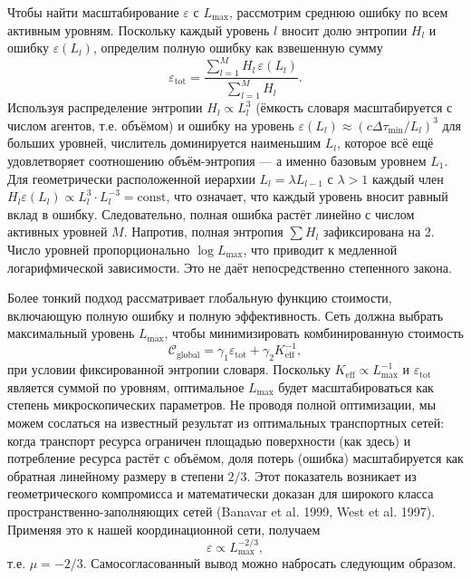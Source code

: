 \documentclass[11pt,a4paper]{article}
\begin{document}
	Чтобы найти масштабирование \(\varepsilon\) с \(L_{\max}\), рассмотрим среднюю ошибку по всем активным уровням. Поскольку каждый уровень \(l\) вносит долю энтропии \(H_l\) и ошибку \(\varepsilon(L_l)\), определим полную ошибку как взвешенную сумму
	\[
	\varepsilon_{\mathrm{tot}} = \frac{\sum_{l=1}^{M} H_l\, \varepsilon(L_l)}{\sum_{l=1}^{M} H_l}.
	\]
	Используя распределение энтропии \(H_l \propto L_l^3\) (ёмкость словаря масштабируется с числом агентов, т.е. объёмом) и ошибку на уровень \(\varepsilon(L_l) \approx (c\Delta\tau_{\min}/L_l)^3\) для больших уровней, числитель доминируется наименьшим \(L_l\), которое всё ещё удовлетворяет соотношению объём-энтропия — а именно базовым уровнем \(L_1\). Для геометрически расположенной иерархии \(L_l = \lambda L_{l-1}\) с \(\lambda > 1\) каждый член \(H_l\varepsilon(L_l) \propto L_l^3 \cdot L_l^{-3} = \text{const}\), что означает, что каждый уровень вносит равный вклад в ошибку. Следовательно, полная ошибка растёт линейно с числом активных уровней \(M\). Напротив, полная энтропия \(\sum H_l\) зафиксирована на 2. Число уровней пропорционально \(\log L_{\max}\), что приводит к медленной логарифмической зависимости. Это не даёт непосредственно степенного закона.
	
	Более тонкий подход рассматривает глобальную функцию стоимости, включающую полную ошибку и полную эффективность. Сеть должна выбрать максимальный уровень \(L_{\max}\), чтобы минимизировать комбинированную стоимость
	\[
	\mathcal{C}_{\mathrm{global}} = \gamma_1 \varepsilon_{\mathrm{tot}} + \gamma_2 K_{\mathrm{eff}}^{-1},
	\]
	при условии фиксированной энтропии словаря. Поскольку \(K_{\mathrm{eff}} \propto L_{\max}^{-1}\) и \(\varepsilon_{\mathrm{tot}}\) является суммой по уровням, оптимальное \(L_{\max}\) будет масштабироваться как степень микроскопических параметров. Не проводя полной оптимизации, мы можем сослаться на известный результат из оптимальных транспортных сетей: когда транспорт ресурса ограничен площадью поверхности (как здесь) и потребление ресурса растёт с объёмом, доля потерь (ошибка) масштабируется как обратная линейному размеру в степени \(2/3\). Этот показатель возникает из геометрического компромисса и математически доказан для широкого класса пространственно-заполняющих сетей (Banavar et al. 1999, West et al. 1997). Применяя это к нашей координационной сети, получаем
	\[
	\varepsilon \propto L_{\max}^{-2/3},
	\]
	т.е. \(\mu = -2/3\). Самосогласованный вывод можно набросать следующим образом.
	
\end{document}
